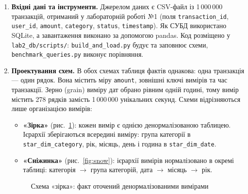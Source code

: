 \begin{enumerate}
  \item \textbf{Вхідні дані та інструменти.} Джерелом даних є CSV-файл із 1\,000\,000 транзакцій, отриманий у лабораторній роботі №1 (поля \texttt{transaction\_id}, \texttt{user\_id}, \texttt{amount}, \texttt{category}, \texttt{status}, \texttt{timestamp}). Як СУБД використано SQLite, а завантаження виконано за допомогою pandas. Код розміщено у \texttt{lab2\_db/scripts/}: \texttt{build\_and\_load.py} будує та заповнює схеми, \texttt{benchmark\_queries.py} виконує порівняння.

  \item \textbf{Проектування схем.} В обох схемах таблиця фактів однакова: одна транзакція — один рядок. Вона містить міру \texttt{amount}, зовнішні ключі вимірів та час транзакції. Зерно (grain) виміру дат обрано рівним одній годині, тому вимір містить 278 рядків замість 1\,000\,000 унікальних секунд. Схеми відрізняються лише організацією вимірів:
  \begin{itemize}
    \item \textbf{«Зірка»} (рис.~\ref{fig:star}): кожен вимір є однією денормалізованою таблицею. Ієрархії зберігаються всередині виміру: група категорії в \texttt{star\_dim\_category}, рік, місяць, день і година в \texttt{star\_dim\_date}.
    \item \textbf{«Сніжинка»} (рис.~\ref{fig:snow}): ієрархії вимірів нормалізовано в окремі таблиці: категорія \(\rightarrow\) група категорій, дата \(\rightarrow\) місяць \(\rightarrow\) рік.
  \end{itemize}

\begin{figure}[H]
\centering
{}
\caption{Схема «зірка»: факт оточений денормалізованими вимірами}
\label{fig:star}
\end{figure}


\end{enumerate}
